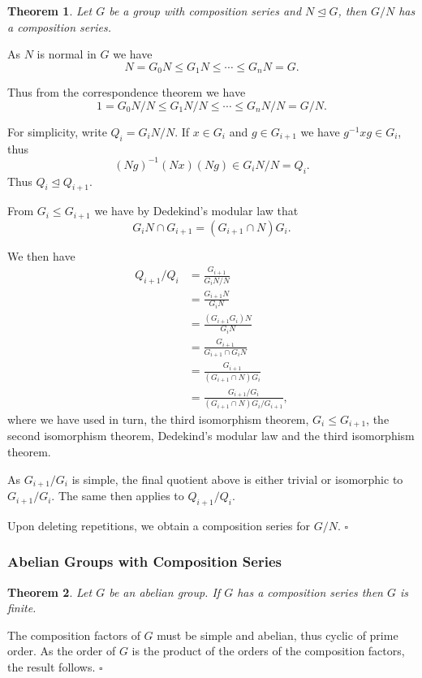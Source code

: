 \documentclass[10pt]{article}
\newtheorem{theorem}{Theorem}[section]
\newenvironment{proof}[1][Proof]{\begin{trivlist}
\item[\hskip \labelsep {\itshape #1}]}{\end{trivlist}}
\begin{document}
\begin{theorem}
Let $G$ be a group with composition series and $N \mathrel{\unlhd} G$, then $G/N$ has a composition series.
\end{theorem}

\begin{proof}
As $N$ is normal in $G$ we have
$$N = G_0N \leq G_1N \leq \cdots \leq G_nN = G.$$

Thus from the correspondence theorem we have
$$1 = G_0N/N \leq G_1N/N \leq \cdots \leq G_nN/N = G/N.$$

For simplicity, write $Q_i = G_iN/N$. If $x \in G_i$ and $g \in G_{i+1}$ we have $g^{-1}xg \in G_i$, thus
$$(Ng)^{-1}(Nx)(Ng) \in G_iN/N = Q_i.$$
Thus $Q_i \mathrel{\unlhd} Q_{i+1}$.

From $G_i \leq G_{i+1}$ we have by Dedekind's modular law that
$$G_iN\cap G_{i+1} = (G_{i+1}\cap N)G_i.$$

We then have
\begin{align*}
Q_{i+1}/Q_i &= \frac{G_{i+1}}{G_iN/N}\\
&= \frac{G_{i+1}N}{G_iN}\\
&= \frac{(G_{i+1}G_i)N}{G_iN}\\
&= \frac{G_{i+1}}{G_{i+1}\cap G_iN}\\
&= \frac{G_{i+1}}{(G_{i+1}\cap N)G_i}\\
&= \frac{G_{i+1}/G_i}{(G_{i+1}\cap N)G_i/G_{i+1}},
\end{align*}
where we have used in turn, the third isomorphism theorem, $G_i \leq G_{i+1}$, the second isomorphism theorem, Dedekind's modular law and the third isomorphism theorem.

As $G_{i+1}/G_i$ is simple, the final quotient above is either trivial or isomorphic to $G_{i+1}/G_i$. The same then applies to $Q_{i+1}/Q_i$.

Upon deleting repetitions, we obtain a composition series for $G/N$. $\square$
\end{proof}

\subsubsection{Abelian Groups with Composition Series}

\begin{theorem}
Let $G$ be an abelian group. If $G$ has a composition series then $G$ is finite.
\end{theorem}

\begin{proof}
The composition factors of $G$ must be simple and abelian, thus cyclic of prime order. As the order of $G$ is the product of the orders of the composition factors, the result follows. $\square$
\end{proof}

\end{document}
